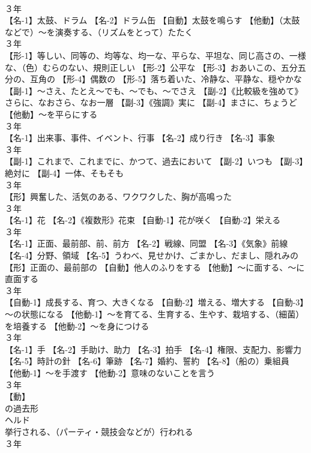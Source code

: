 \documentclass[8pt]{extreport}
\begin{document}
\begin{CJK}{UTF8}{min}
\\	３年	
\\	【名-1】太鼓、ドラム 【名-2】ドラム缶 【自動】太鼓を鳴らす 【他動】（太鼓などで）～を演奏する、（リズムをとって）たたく
\\	３年	
\\	【形-1】等しい、同等の、均等な、均一な、平らな、平坦な、同じ高さの、一様な、（色）むらのない、規則正しい 【形-2】公平な 【形-3】おあいこの、五分五分の、互角の 【形-4】偶数の 【形-5】落ち着いた、冷静な、平静な、穏やかな 【副-1】～さえ、たとえ～でも、～でも、～でさえ 【副-2】《比較級を強めて》さらに、なおさら、なお一層 【副-3】《強調》実に 【副-4】まさに、ちょうど 【他動】～を平らにする
\\	３年	
\\	【名-1】出来事、事件、イベント、行事 【名-2】成り行き 【名-3】事象
\\	３年	
\\	【副-1】これまで、これまでに、かつて、過去において 【副-2】いつも 【副-3】絶対に 【副-4】一体、そもそも
\\	３年	
\\	【形】興奮した、活気のある、ワクワクした、胸が高鳴った
\\	３年	
\\	【名-1】花 【名-2】《複数形》花束 【自動-1】花が咲く 【自動-2】栄える
\\	３年	
\\	【名-1】正面、最前部、前、前方 【名-2】戦線、同盟 【名-3】《気象》前線 【名-4】分野、領域 【名-5】うわべ、見せかけ、ごまかし、だまし、隠れみの 【形】正面の、最前部の 【自動】他人のふりをする 【他動】～に面する、～に直面する
\\	３年	
\\	【自動-1】成長する、育つ、大きくなる 【自動-2】増える、増大する 【自動-3】～の状態になる 【他動-1】～を育てる、生育する、生やす、栽培する、（細菌）を培養する 【他動-2】～を身につける
\\	３年	
\\	【名-1】手 【名-2】手助け、助力 【名-3】拍手 【名-4】権限、支配力、影響力 【名-5】時計の針 【名-6】筆跡 【名-7】婚約、誓約 【名-8】（船の）乗組員 【他動-1】～を手渡す 【他動-2】意味のないことを言う
\\	３年	
\\	【動】
\\	の過去形 
\\	ヘルド 
\\	挙行される、（パーティ・競技会などが）行われる
\\	３年	

\end{CJK}
\end{document}
